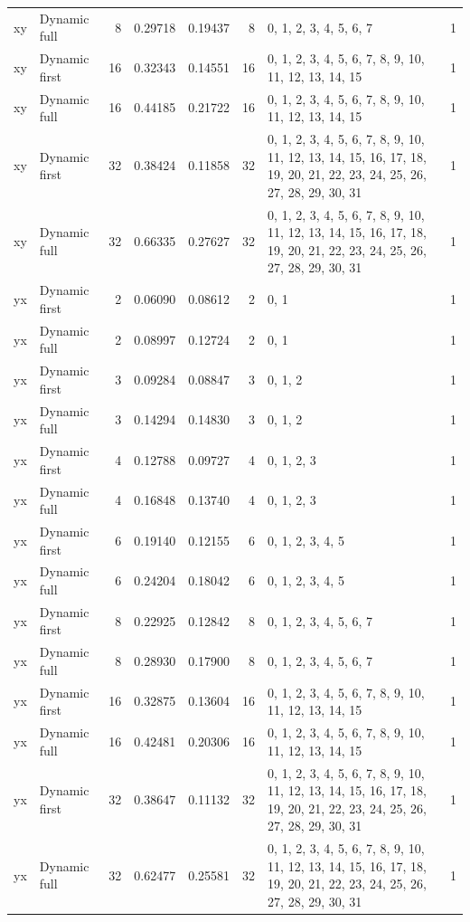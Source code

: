 \documentclass[10pt,a4paper]{article}
\begin{document}
\begin{longtable}{@{}p{23mm}p{29mm}rrrrp{36mm}r@{}}
xy & Dynamic full & 8 & 0.29718 & 0.19437 & 8 & 0, 1, 2, 3, 4, 5, 6, 7 & 1 \\
xy & Dynamic first & 16 & 0.32343 & 0.14551 & 16 & 0, 1, 2, 3, 4, 5, 6, 7, 8, 9, 10, 11, 12, 13, 14, 15 & 1 \\
xy & Dynamic full & 16 & 0.44185 & 0.21722 & 16 & 0, 1, 2, 3, 4, 5, 6, 7, 8, 9, 10, 11, 12, 13, 14, 15 & 1 \\
xy & Dynamic first & 32 & 0.38424 & 0.11858 & 32 & 0, 1, 2, 3, 4, 5, 6, 7, 8, 9, 10, 11, 12, 13, 14, 15, 16, 17, 18, 19, 20, 21, 22, 23, 24, 25, 26, 27, 28, 29, 30, 31 & 1 \\
xy & Dynamic full & 32 & 0.66335 & 0.27627 & 32 & 0, 1, 2, 3, 4, 5, 6, 7, 8, 9, 10, 11, 12, 13, 14, 15, 16, 17, 18, 19, 20, 21, 22, 23, 24, 25, 26, 27, 28, 29, 30, 31 & 1 \\
yx & Dynamic first & 2 & 0.06090 & 0.08612 & 2 & 0, 1 & 1 \\
yx & Dynamic full & 2 & 0.08997 & 0.12724 & 2 & 0, 1 & 1 \\
yx & Dynamic first & 3 & 0.09284 & 0.08847 & 3 & 0, 1, 2 & 1 \\
yx & Dynamic full & 3 & 0.14294 & 0.14830 & 3 & 0, 1, 2 & 1 \\
yx & Dynamic first & 4 & 0.12788 & 0.09727 & 4 & 0, 1, 2, 3 & 1 \\
yx & Dynamic full & 4 & 0.16848 & 0.13740 & 4 & 0, 1, 2, 3 & 1 \\
yx & Dynamic first & 6 & 0.19140 & 0.12155 & 6 & 0, 1, 2, 3, 4, 5 & 1 \\
yx & Dynamic full & 6 & 0.24204 & 0.18042 & 6 & 0, 1, 2, 3, 4, 5 & 1 \\
yx & Dynamic first & 8 & 0.22925 & 0.12842 & 8 & 0, 1, 2, 3, 4, 5, 6, 7 & 1 \\
yx & Dynamic full & 8 & 0.28930 & 0.17900 & 8 & 0, 1, 2, 3, 4, 5, 6, 7 & 1 \\
yx & Dynamic first & 16 & 0.32875 & 0.13604 & 16 & 0, 1, 2, 3, 4, 5, 6, 7, 8, 9, 10, 11, 12, 13, 14, 15 & 1 \\
yx & Dynamic full & 16 & 0.42481 & 0.20306 & 16 & 0, 1, 2, 3, 4, 5, 6, 7, 8, 9, 10, 11, 12, 13, 14, 15 & 1 \\
yx & Dynamic first & 32 & 0.38647 & 0.11132 & 32 & 0, 1, 2, 3, 4, 5, 6, 7, 8, 9, 10, 11, 12, 13, 14, 15, 16, 17, 18, 19, 20, 21, 22, 23, 24, 25, 26, 27, 28, 29, 30, 31 & 1 \\
yx & Dynamic full & 32 & 0.62477 & 0.25581 & 32 & 0, 1, 2, 3, 4, 5, 6, 7, 8, 9, 10, 11, 12, 13, 14, 15, 16, 17, 18, 19, 20, 21, 22, 23, 24, 25, 26, 27, 28, 29, 30, 31 & 1 \\
\end{longtable}\normalsize\setlength{\tabcolsep}{6pt}
\clearpage
\end{document}
